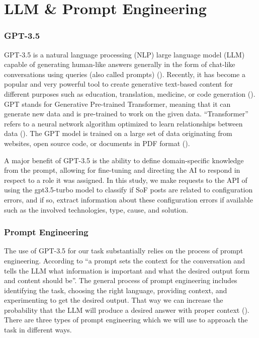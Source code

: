 \documentclass[english,bachelor]{swsLeipzig}
\begin{document}
\section{LLM \& Prompt Engineering}
\subsubsection{GPT-3.5}
GPT-3.5 is a natural language processing (NLP) large language model (LLM) capable of generating human-like answers 
generally in the form of chat-like conversations using queries (also called prompts) (\citet{bahrini:2023}). Recently, it has become a popular and very powerful tool to create generative text-based content for different purposes such as education, translation, medicine, or code generation (\citet{liu:2023}). GPT stands for Generative Pre-trained Transformer, meaning that it can generate new data and is pre-trained to work on the given data. ``Transformer'' refers to a neural network algorithm optimized to learn relationships between data (\citet{perrigo:2023}). The GPT model is trained on a large set of data originating from websites, open source code, or documents in PDF format (\citet{bahrini:2023}).

A major benefit of GPT-3.5 is the ability to define domain-specific knowledge from the prompt, allowing for fine-tuning 
and directing the AI to respond in respect to a role it was assigned. In this study, we make requests to the API of \citeauthor{openai:2023} using the gpt3.5-turbo model to classify if SoF posts are related to configuration errors, and if so, extract information about these configuration errors if available such as the involved technologies, type, cause, and solution.

\subsubsection{Prompt Engineering}\label{sec:pe}
The use of GPT-3.5 for our task substantially relies on the process of prompt engineering. According to \citet{white:2023} ``a prompt sets the context for the conversation and tells the LLM what information is important and what the desired output form and content should be''. The general process of prompt engineering includes identifying the task, choosing the right language, providing context, and experimenting to get the desired output. That way we can increase the probability that the LLM will produce a desired answer with proper context (\citet{reynolds:2021}). There are three types of prompt engineering which we will use to approach the task in different ways.
\end{document}
